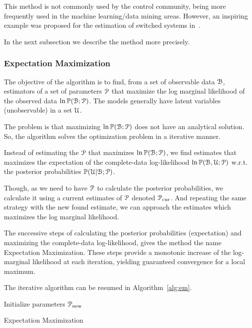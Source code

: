 \documentclass[../main.tex]{subfiles}
\begin{document}
This method is not commonly used by the control community, being more frequently used in the machine learning/data mining areas.
However, an inspiring example was proposed for the estimation of switched systems in~\cite{NakadaEtAl2005}.

In the next subsection we describe the method more precisely.

\subsubsection{Expectation Maximization}
The objective of the \EM{} algorithm is to find, from a set of observable data $\mathcal{B}$, estimators of a set of parameters $\mathcal{P}$ that maximize the log marginal likelihood of the observed data ${\ln\mathbb{P}(\mathcal{B};\mathcal{P})}$. The models generally have latent variables (unobservable) in a set $\mathcal{U}$.

The problem is that maximizing ${\ln\mathbb{P}(\mathcal{B};\mathcal{P})}$ does not have an analytical solution.
So, the algorithm solves the optimization problem in a iterative manner.

Instead of estimating the $\mathcal{P}$ that maximizes ${\ln\mathbb{P}(\mathcal{B};\mathcal{P})}$, we find estimates that maximizes the expectation of the complete-data log-likelihood $\ln\mathbb{P}(\mathcal{B},\mathcal{U};\mathcal{P})$ w.r.t.
the posterior probabilities ${\mathbb{P}(\mathcal{U}|\mathcal{B};\mathcal{P})}$.

Though, as we need to have $\mathcal{P}$ to calculate the posterior probabilities, we
calculate it using a current estimates of $\mathcal{P}$ denoted $\mathcal{P}_{\mathrm{cur}}$.
And repeating the same strategy with the new found estimate, we can approach the estimates which maximizes the log marginal likelihood.

The successive steps of calculating the posterior probabilities (expectation) and maximizing the complete-data log-likelihood, gives the method the name Expectation Maximization.
These steps provide a monotonic increase of the log-marginal likelihood at each iteration, yielding guaranteed convergence for a local maximum.

The iterative algorithm can be resumed in Algorithm~\ref{alg:em}.

\begin{algorithm2e}[h]
  \DontPrintSemicolon%
  Initialize parameters $\mathcal{P}_{\mathrm{new}}$\;
 \caption{Expectation Maximization}\label{alg:em}
\end{algorithm2e}
\end{document}
